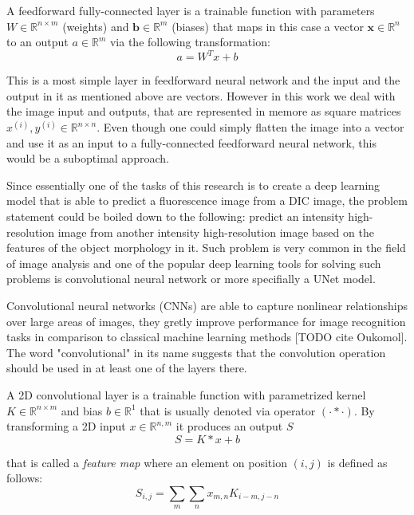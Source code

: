 \begin{definition}
	A feedforward fully-connected layer is a trainable function with parameters $W \in \mathbb{R}^{n \times m}$ (weights) and $\mathbf{b} \in \mathbb{R}^{m}$ (biases) that maps in this case a vector $\mathbf{x} \in \mathbb{R}^{n}$ to an output $a \in \mathbb{R}^{m}$ via the following transformation:
		\begin{equation}
			a = W^{T}x + b
		\end{equation}
\end{definition}

This is a most simple layer in feedforward neural network and the input and the output in it as mentioned above are vectors. However in this work we deal with the image input and outputs, that are represented in memore as square matrices $x^{(i)}, y^{(i)} \in \mathbb{R}^{n \times n}$. Even though one could simply flatten the image into a vector and use it as an input to a fully-connected feedforward neural network, this would be a suboptimal approach. 

Since essentially one of the tasks of this research is to create a deep learning model that is able to predict a fluorescence image from a DIC image, the problem statement could be boiled down to the following: predict an intensity high-resolution image from another intensity high-resolution image based on the features of the object morphology in it. Such problem is very common in the field of image analysis and one of the popular deep learning tools for solving such problems is convolutional neural network or more specifially a UNet model.

Convolutional neural networks (CNNs) are able to capture nonlinear relationships over large areas of images, they gretly improve performance for image recognition tasks in comparison to classical machine learning methods [TODO cite Oukomol]. The word "convolutional" in its name suggests that the convolution operation should be used in at least one of the layers there.  

\begin{definition}
	A 2D convolutional layer is a trainable function with parametrized kernel $K \in \mathbb{R}^{n \times m}$ and bias $b \in \mathbb{R}^{1}$ that is usually denoted via operator $(\cdot * \cdot)$. By transforming a 2D input $x \in \mathbb{R}^{n, m}$ it produces an output $S$
	\begin{equation}
		S = K * x + b
	\end{equation}

	that is called a \textit{feature map} where an element on position $(i, j)$ is defined as follows:
		\begin{equation}
			S_{i, j} = \sum_{m} \sum_{n} x_{m, n}  K_{i - m, j - n}
		\end{equation}
\end{definition}

